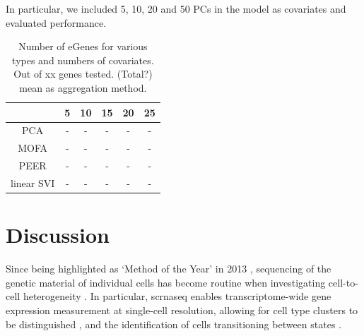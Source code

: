 In particular, we included 5, 10, 20 and 50 PCs in the model as covariates and evaluated performance.


\begin{table}[h]
    \centering
    \begin{tabular}{c|c c c c c}
    &         5 & 10 & 15 & 20 & 25  \\
    \hline
    PCA   & - & - &  - & - & -  \\
    MOFA  & - & - &  - & - & -  \\
    PEER  & - & - &  - & - & -  \\
    linear SVI  & - & - &  - & - & -  \\
    \end{tabular}
    \caption[Number and type of covariate comparison]{Number of eGenes for various types and numbers of covariates. 
    Out of xx genes tested.
    (Total?) mean as aggregation method.}
    \label{tab:covariates}
\end{table}





\clearpage

\section{Discussion}

Since being highlighted as `Method of the Year' in 2013 \cite{editorial2014method}, sequencing of the genetic material of individual cells has become routine when investigating cell-to-cell heterogeneity \cite{lahnemann2020eleven}. 
In particular, 
\gls{scrnaseq}
enables transcriptome-wide gene expression measurement at single-cell resolution, allowing for cell type clusters to be distinguished \cite{anchang2016visualization, young2018single, muraro2016single, ernst2019staged, pijuan2019single, velten2017human},
and the identification of cells transitioning between states \cite{la2018rna, buettner2015computational, trapnell2014dynamics, bendall2014single, moignard2015decoding}. \\

